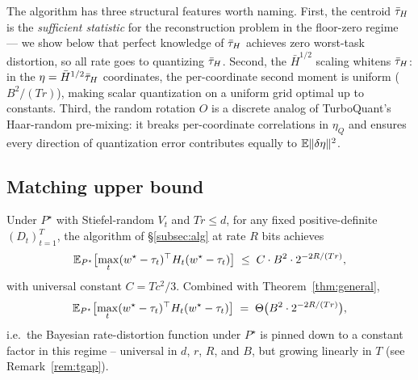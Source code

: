 The algorithm has three structural features worth naming. First,
the centroid $\bar{\tau}_H$ is the \emph{sufficient statistic} for the
reconstruction problem in the floor-zero regime — we show below
that perfect knowledge of $\bar{\tau}_H$ achieves zero worst-task
distortion, so all rate goes to quantizing $\bar{\tau}_H$. Second, the
$\bar H^{1/2}$ scaling whitens $\bar{\tau}_H$: in the $\eta = \bar H^{1/2}
\bar{\tau}_H$ coordinates, the per-coordinate second moment is uniform
($B^2/(Tr)$), making scalar quantization on a uniform grid
optimal up to constants. Third, the random rotation $O$ is a
discrete analog of TurboQuant's Haar-random pre-mixing: it
breaks per-coordinate correlations in $\eta_Q$ and ensures every
direction of quantization error contributes equally to
$\mathbb{E}\|\delta\eta\|^2$.

\subsection{Matching upper bound}\label{subsec:match}

\begin{theorem}
\label{thm:achv}
Under $P^\star$ with Stiefel-random $V_t$ and $Tr\leq d$, for
any fixed positive-definite $(D_t)_{t=1}^T$, the algorithm of
\S\ref{subsec:alg} at rate $R$ bits achieves
\begin{equation}\label{eq:thm-ub}
  \mathbb{E}_{P^\star}\bigl[\max_t(w^\star-\tau_t)^\top H_t(w^\star-
  \tau_t)\bigr]
  \;\leq\; C\cdot B^2 \cdot 2^{-2R/(Tr)},
\end{equation}
with universal constant $C = T c^2 / 3$. Combined with
Theorem~\ref{thm:general},
\begin{equation*}
  \mathbb{E}_{P^\star}\bigl[\max_t(w^\star-\tau_t)^\top H_t(w^\star-
  \tau_t)\bigr] \;=\; \Theta\bigl(B^2\cdot 2^{-2R/(Tr)}\bigr),
\end{equation*}
i.e.\ the Bayesian rate-distortion function under $P^\star$ is
pinned down to a constant factor in this regime -- universal in
$d$, $r$, $R$, and $B$, but growing linearly in $T$ (see
Remark~\ref{rem:tgap}).
\end{theorem}

